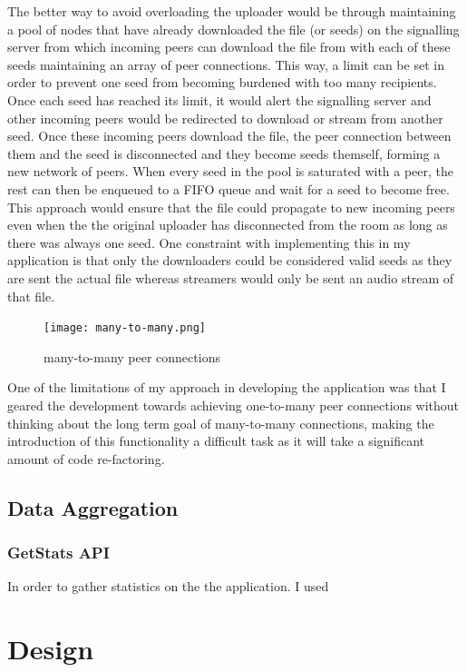 \documentclass[]{report}
\begin{document}
			The better way to avoid overloading the uploader would be through maintaining a pool of nodes that have already downloaded the file (or seeds) on the signalling server from which incoming peers can download the file from with each of these seeds maintaining an array of peer connections. This way, a limit can be set in order to prevent one seed from becoming burdened with too many recipients. Once each seed has reached its limit, it would alert the signalling server and other incoming peers would be redirected to download or stream from another seed. Once these incoming peers download the file, the peer connection between them and the seed is disconnected and they become seeds themself, forming a new network of peers. When every seed in the pool is saturated with a peer, the rest can then be enqueued to a FIFO queue and wait for a seed to become free. This approach would ensure that the file could propagate to new incoming peers even when the the original uploader has disconnected from the room as long as there was always one seed. One constraint with implementing this in my application is that only the downloaders could be considered valid seeds as they are sent the actual file whereas streamers would only be sent an audio stream of that file.
			
			\begin{figure}[H]
				\caption{many-to-many peer connections}
				\centering
				\texttt{[image: many-to-many.png]}
			\end{figure}	
			
			One of the limitations of my approach in developing the application was that I geared the development towards achieving one-to-many peer connections without thinking about the long term goal of many-to-many connections, making the introduction of this functionality a difficult task as it will take a significant amount of code re-factoring.
			
			\subsection{Data Aggregation}
				\subsubsection{GetStats API}
				In order to gather statistics on the the application. I used
			
				
		\section{Design}			
\end{document}
